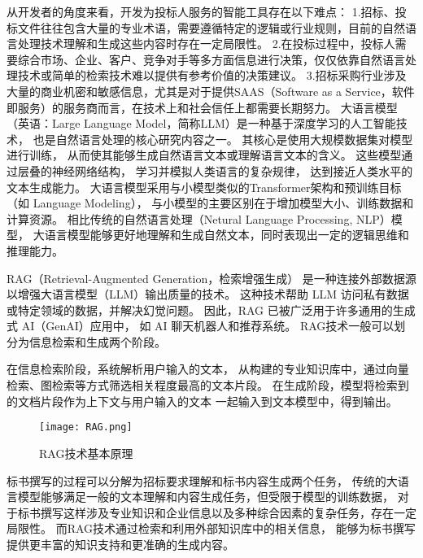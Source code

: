 \documentclass{xmu}
\begin{document}
从开发者的角度来看，开发为投标人服务的智能工具存在以下难点：
1.招标、投标文件往往包含大量的专业术语，需要遵循特定的逻辑或行业规则，目前的自然语言处理技术理解和生成这些内容时存在一定局限性。
2.在投标过程中，投标人需要综合市场、企业、客户、竞争对手等多方面信息进行决策，仅仅依靠自然语言处理技术或简单的检索技术难以提供有参考价值的决策建议。
3.招标采购行业涉及大量的商业机密和敏感信息，尤其是对于提供SAAS（Software as a Service，软件即服务）的服务商而言，在技术上和社会信任上都需要长期努力。
大语言模型（英语：Large Language Model，简称LLM）是一种基于深度学习的人工智能技术，
也是自然语言处理的核心研究内容之一。
其核心是使用大规模数据集对模型进行训练，
从而使其能够生成自然语言文本或理解语言文本的含义。
这些模型通过层叠的神经网络结构，
学习并模拟人类语言的复杂规律，
达到接近人类水平的文本生成能力。
大语言模型采用与小模型类似的Transformer架构和预训练目标（如 Language Modeling），
与小模型的主要区别在于增加模型大小、训练数据和计算资源。
相比传统的自然语言处理（Netural Language Processing, NLP）模型，
大语言模型能够更好地理解和生成自然文本，同时表现出一定的逻辑思维和推理能力。


RAG（Retrieval-Augmented Generation，检索增强生成）
是一种连接外部数据源以增强大语言模型（LLM）输出质量的技术。
这种技术帮助 LLM 访问私有数据或特定领域的数据，并解决幻觉问题。
因此，RAG 已被广泛用于许多通用的生成式 AI（GenAI）应用中，
如 AI 聊天机器人和推荐系统。
RAG技术一般可以划分为信息检索和生成两个阶段。

在信息检索阶段，系统解析用户输入的文本，
从构建的专业知识库中，通过向量检索、图检索等方式筛选相关程度最高的文本片段。
在生成阶段，模型将检索到的文档片段作为上下文与用户输入的文本
一起输入到文本模型中，得到输出。
\begin{figure}[!htb]
    \centering
    \texttt{[image: RAG.png]}\\
    \caption{RAG技术基本原理}\label{ragyuanli}
\end{figure}
标书撰写的过程可以分解为招标要求理解和标书内容生成两个任务，
传统的大语言模型能够满足一般的文本理解和内容生成任务，但受限于模型的训练数据，
对于标书撰写这样涉及专业知识和企业信息以及多种综合因素的复杂任务，存在一定局限性。
而RAG技术通过检索和利用外部知识库中的相关信息，
能够为标书撰写提供更丰富的知识支持和更准确的生成内容。
\end{document}
